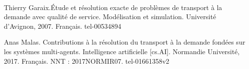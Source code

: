 \documentclass{article}
\begin{document}



\paragraph{}
Thierry Garaix.Étude et résolution exacte de problèmes de transport à la demande avec qualité de service. Modélisation et simulation. Université d’Avignon, 2007. Français. tel-00534894

Anas Malas. Contributions à la résolution du transport à la demande fondées sur les systèmes multi-agents. Intelligence artificielle [cs.AI]. Normandie Université, 2017. Français. NNT : 2017NORMIR07. tel-01661358v2
\end{document}

